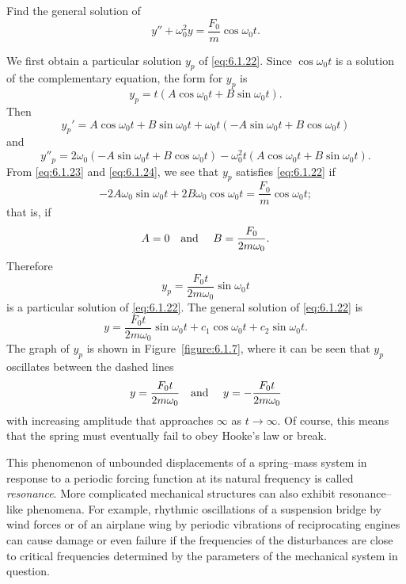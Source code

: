 \begin{example}
  \label{example:6.1.5}\rm Find the general solution of
  \begin{equation}
    \label{eq:6.1.22}y''+\omega_{0}^{2}y=\frac{F_{0}}{m}\cos\omega_{0}t.
  \end{equation}
\end{example}

\begin{examplesolution}
\solution We first obtain a particular solution $y_{p}$ of \eqref{eq:6.1.22}. Since
$\cos\omega_{0}t$ is a solution of the complementary equation, the form for $y_{p}$ is
\begin{equation}
  \label{eq:6.1.23}y_{p}=t(A\cos\omega_{0}t+B\sin\omega_{0}t).
\end{equation}
Then
\[
  y_{p}'=A\cos\omega_{0}t+B\sin\omega_{0}t +\omega_{0}t(-A\sin\omega_{0}t+B\cos\omega_{0}t)
\]
and
\begin{equation}
  \label{eq:6.1.24}y''_{p}=2\omega_{0}(-A\sin\omega_{0}t +B\cos\omega_{0}t)-\omega_{0}^{2}t(A\cos\omega_{0}t+B\sin\omega_{0}t).
\end{equation}
From \eqref{eq:6.1.23} and \eqref{eq:6.1.24}, we see that $y_{p}$ satisfies \eqref{eq:6.1.22} if
\[
  -2A\omega_{0}\sin\omega_{0}t+2B\omega_{0}\cos\omega_{0}t=\frac{F_{0}}{m}\cos\omega_{0}t;
\]
that is, if
\[
  A=0\mbox{\quad and \quad}B=\frac{F_{0}}{2m\omega_{0}}.
\]
Therefore
\[
  y_{p}=\frac{F_{0}t}{2m\omega_{0}}\sin\omega_{0}t
\]
is a particular solution of \eqref{eq:6.1.22}. The general solution of \eqref{eq:6.1.22} is
\[
  y=\frac{F_{0}t}{2m\omega_{0}}\sin\omega_{0}t+c_{1}\cos\omega_{0}t+c_{2}\sin\omega_{0}t.
\]
The graph of $y_{p}$ is shown in Figure~\ref{figure:6.1.7}, where it can be seen that $y_{p}$
oscillates between the dashed lines
\[
  y=\frac{F_{0}t}{2m\omega_{0}}\mbox{\quad and \quad}y=-\frac{F_{0}t}{2m\omega_{0}}
\]
with increasing amplitude that approaches $\infty$ as $t\to\infty$. Of course, this means that the
spring must eventually fail to obey Hooke's law or break.\bbox
\end{examplesolution}

This phenomenon of unbounded displacements of a spring--mass system in response to a periodic
forcing function at its natural frequency is called {\color{blue}\it resonance\/}. More complicated
mechanical structures can also exhibit resonance--like phenomena. For example, rhythmic oscillations
of a suspension bridge by wind forces or of an airplane wing by periodic vibrations of reciprocating
engines can cause damage or even failure if the frequencies of the disturbances are close to
critical frequencies determined by the parameters of the mechanical system in question.

